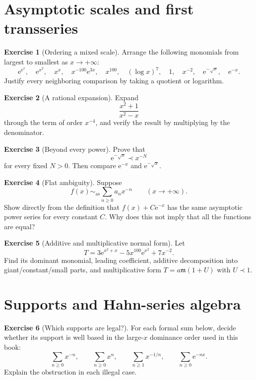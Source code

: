 \documentclass[11pt,oneside]{book}
\theoremstyle{definition}
\newtheorem{exercise}{Exercise}[chapter]
\theoremstyle{remark}
\newcommand{\m}{\mathfrak{m}}
\newcommand{\asympseries}{\sim_{\!\mathrm{as}}}
\newcommand{\e}{\mathrm{e}}
\newcommand{\precdom}{\prec}
\begin{document}
\section{Asymptotic scales and first transseries}

\begin{exercise}[Ordering a mixed scale]
\label{ex:order-mixed}
Arrange the following monomials from largest to smallest as $x\to+\infty$:
\[
  \e^{\e^x},\quad \e^{x^2},\quad x^x,\quad
  x^{-100}\e^{3x},\quad x^{100},\quad(\log x)^7,
  \quad1,\quad x^{-2},\quad\e^{-\sqrt x},\quad\e^{-x}.
\]
Justify every neighboring comparison by taking a quotient or logarithm.
\end{exercise}

\begin{exercise}[A rational expansion]
\label{ex:rational-expansion}
Expand
\[
  \frac{x^2+1}{x^2-x}
\]
through the term of order $x^{-4}$, and verify the result by multiplying by the
denominator.
\end{exercise}

\begin{exercise}[Beyond every power]
\label{ex:beyond-power}
Prove that
\[
  \e^{-\sqrt x}\precdom x^{-N}
\]
for every fixed $N>0$. Then compare $\e^{-x}$ and $\e^{-\sqrt x}$.
\end{exercise}

\begin{exercise}[Flat ambiguity]
\label{ex:flat-ambiguity}
Suppose
\[
  f(x)\asympseries\sum_{n\ge0}a_nx^{-n}
  \qquad(x\to+\infty).
\]
Show directly from the definition that $f(x)+C\e^{-x}$ has the same asymptotic
power series for every constant $C$. Why does this not imply that all the
functions are equal?
\end{exercise}

\begin{exercise}[Additive and multiplicative normal form]
\label{ex:normal-form}
Let
\[
  T=3\e^{x^2+x}-5x^{100}\e^{x^2}+7x^{-2}.
\]
Find its dominant monomial, leading coefficient, additive decomposition into
giant/constant/small parts, and multiplicative form $T=a\m(1+U)$ with
$U\precdom1$.
\end{exercise}

\section{Supports and Hahn-series algebra}

\begin{exercise}[Which supports are legal?]
\label{ex:legal-supports}
For each formal sum below, decide whether its support is well based in the
large-$x$ dominance order used in this book:
\[
  \sum_{n\ge0}x^{-n},\qquad
  \sum_{n\ge0}x^n,\qquad
  \sum_{n\ge1}x^{-1/n},\qquad
  \sum_{n\ge0}\e^{-nx}.
\]
Explain the obstruction in each illegal case.
\end{exercise}
\end{document}
